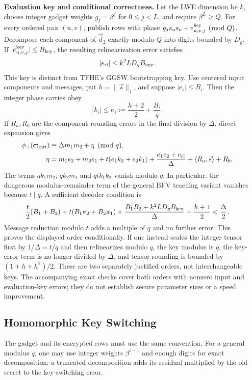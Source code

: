 \textbf{Evaluation key and conditional correctness.} Let the LWE dimension be $k$, choose integer gadget weights $g_j=\beta^j$ for $0\leq j<L$, and require $\beta^L\geq Q$. For every ordered pair $(u,v)$, publish rows with phase $g_js_us_v+e_{u,v,j}^{\rm key}\pmod Q$. Decompose each component of $\vec d_2$ exactly modulo $Q$ into digits bounded by $D_g$. If $|e_{u,v,j}^{\rm key}|\leq B_{\rm key}$, the resulting relinearization error satisfies
\[
|e_{\rm rl}|\leq k^2LD_gB_{\rm key}.
\]
This key is distinct from TFHE's GGSW bootstrapping key. Use centered input components and messages, put $h=\|\vec s\|_1$, and suppose $|e_i|\leq B_i$. Then the integer phase carries obey
\[
|k_i|\leq\kappa_i:=\frac{h+2}{2}+\frac{B_i}{q}.
\]
If $R_a,R_b$ are the component rounding errors in the final division by $\Delta$, direct expansion gives
\[
\begin{aligned}
\phi_+(\textsf{ct}_{\rm out})&\equiv\Delta m_1m_2+\eta\pmod q,\\
\eta&=m_1e_2+m_2e_1+t(e_1k_2+e_2k_1)
      +\frac{e_1e_2+e_{\rm rl}}\Delta
      +\langle R_a,\vec s\rangle+R_b.
\end{aligned}
\]
The terms $qk_1m_2$, $qk_2m_1$ and $qt k_1k_2$ vanish modulo $q$. In particular, the dangerous modulus-remainder term of the general BFV teaching variant vanishes because $t\mid q$. A sufficient decoder condition is
\[
\frac t2(B_1+B_2)+t(B_1\kappa_2+B_2\kappa_1)
+\frac{B_1B_2+k^2LD_gB_{\rm key}}\Delta+\frac{h+1}{2}
<\frac\Delta2.
\]
Message reduction modulo $t$ adds a multiple of $q$ and no further error. This proves the displayed order conditionally. If one instead scales the integer tensor first by $1/\Delta=t/q$ and then relinearizes modulo $q$, the key modulus is $q$, the key-error term is no longer divided by $\Delta$, and tensor rounding is bounded by $(1+h+h^2)/2$. These are two separately justified orders, not interchangeable keys. The accompanying exact checks cover both orders with nonzero input and evaluation-key errors; they do not establish secure parameter sizes or a speed improvement.

\subsection{Homomorphic Key Switching}
\label{subsec:bfv-key-switching}

The gadget and its encrypted rows must use the same convention. For a general modulus $q$, one may use integer weights $\beta^{i-1}$ and enough digits for exact decomposition; a truncated decomposition adds its residual multiplied by the old secret to the key-switching error.

